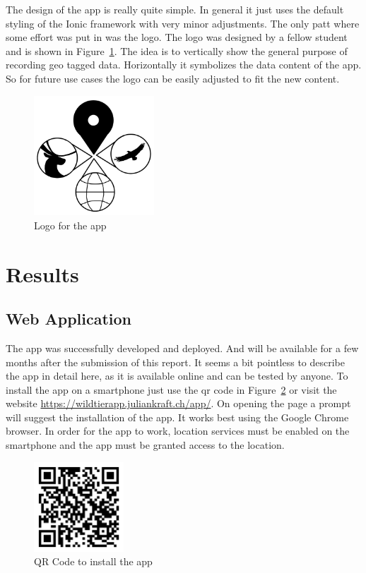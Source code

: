 \documentclass{josis}
\begin{document}
The design of the app is really quite simple. In general it just uses the default styling of the Ionic framework with very minor adjustments.
The only patt where some effort was put in was the logo. The logo was designed by a fellow student and is shown in Figure~\ref{fig:logo}.
The idea is to vertically show the general purpose of recording geo tagged data. Horizontally it symbolizes the data content of the app.
So for future use cases the logo can be easily adjusted to fit the new content.
\begin{figure}[tbh]
    \centering
    \includegraphics[width=0.4\textwidth]{images/logo_app.png}
    \caption{Logo for the app}\label{fig:logo}
\end{figure}

\section{Results}

\subsection{Web Application}

The app was successfully developed and deployed. And will be available for a few months after the submission of this report.
It seems a bit pointless to describe the app in detail here, as it is available online and can be tested by anyone.
To install the app on a smartphone just use the qr code in Figure~\ref{fig:qr_code_app} or visit 
the website \url{https://wildtierapp.juliankraft.ch/app/}. On opening the page a prompt will suggest the installation of the app.
It works best using the Google Chrome browser. In order for the app to work, location services must be enabled on the smartphone
and the app must be granted access to the location.

\begin{figure}[tbh]
    \centering
    \includegraphics[width=0.3\textwidth]{images/qr_code_app.png}
    \caption{QR Code to install the app}\label{fig:qr_code_app}
\end{figure}
\end{document}
